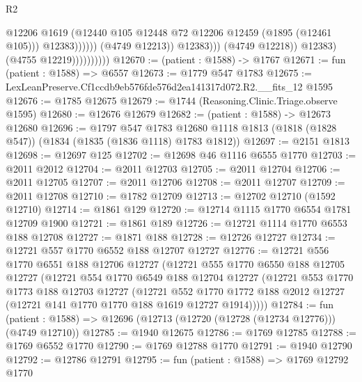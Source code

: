 \begin{lexlean}{R2}
\begin{coremodule}
                                              @12206
                                              @1619
                                              (@12440
                                                @105
                                                @12448
                                                @72
                                                @12206
                                                @12459
                                                (@1895 (@12461 @105)))
                                              @12383))))))
                                  (@4749 @12213))
                                @12383)))
                          (@4749 @12218))
                        @12383)
                      (@4755 @12219))))))))))
@12670 := (patient : @1588) -> @1767
@12671 := fun (patient : @1588) => @6557
@12673 := @1779 @547 @1783
@12675 := LexLeanPreserve.Cf1ccdb9eb576fde576d2ea141317d072.R2.__fits_12 @1595
@12676 := @1785 @12675
@12679 := @1744 (Reasoning.Clinic.Triage.observe @1595)
@12680 := @12676 @12679
@12682 := (patient : @1588) -> @12673 @12680
@12696 := @1797
    @547
    @1783
    @12680
    @1118
    @1813
    (@1818 (@1828 @547))
    (@1834 (@1835 (@1836 @1118) @1783 @1812))
@12697 := @2151 @1813
@12698 := @12697 @125
@12702 := @12698 @46 @1116 @6555 @1770
@12703 := @2011 @2012
@12704 := @2011 @12703
@12705 := @2011 @12704
@12706 := @2011 @12705
@12707 := @2011 @12706
@12708 := @2011 @12707
@12709 := @2011 @12708
@12710 := @1782 @12709
@12713 := @12702 @12710 (@1592 @12710)
@12714 := @1861 @129
@12720 := @12714 @1115 @1770 @6554 @1781 @12709 @1900
@12721 := @1861 @189
@12726 := @12721 @1114 @1770 @6553 @188 @12708
@12727 := @1871 @188
@12728 := @12726 @12727
@12734 := @12721 @557 @1770 @6552 @188 @12707 @12727
@12776 := @12721
    @556
    @1770
    @6551
    @188
    @12706
    @12727
    (@12721
      @555
      @1770
      @6550
      @188
      @12705
      @12727
      (@12721
        @554
        @1770
        @6549
        @188
        @12704
        @12727
        (@12721
          @553
          @1770
          @1773
          @188
          @12703
          @12727
          (@12721
            @552
            @1770
            @1772
            @188
            @2012
            @12727
            (@12721 @141 @1770 @1770 @188 @1619 @12727 @1914)))))
@12784 := fun (patient : @1588) => @12696 (@12713 (@12720 (@12728 (@12734 @12776))) (@4749 @12710))
@12785 := @1940 @12675
@12786 := @1769 @12785
@12788 := @1769 @6552 @1770
@12790 := @1769 @12788 @1770
@12791 := @1940 @12790
@12792 := @12786 @12791
@12795 := fun (patient : @1588) => @1769 @12792 @1770

\end{coremodule}
\end{lexlean}
